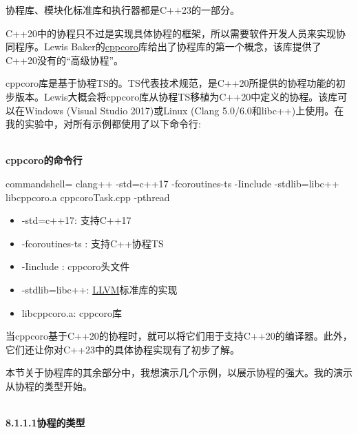协程库、模块化标准库和执行器都是C++23的一部分。



C++20中的协程只不过是实现具体协程的框架，所以需要软件开发人员来实现协同程序。Lewis Baker的\href{https://github.com/lewissbaker/cppcoro}{cppcoro}库给出了协程库的第一个概念，该库提供了C++20没有的“高级协程”。

\begin{tcolorbox}[breakable,enhanced jigsaw,colback=blue!5!white,colframe=blue!75!black,title={使用cppcoro}]
	
cppcoro库是基于协程TS的。TS代表技术规范，是C++20所提供的协程功能的初步版本。Lewis大概会将cppcoro库从协程TS移植为C++20中定义的协程。该库可以在Windows (Visual Studio 2017)或Linux (Clang 5.0/6.0和libc++)上使用。在我的实验中，对所有示例都使用了以下命令行:

\hspace*{\fill} \\ %
\noindent
\textbf{cppcoro的命令行}
{\footnotesize
\begin{tcblisting}{commandshell={}}
clang++ -std=c++17 -fcoroutines-ts -Iinclude -stdlib=libc++ libcppcoro.a
  cppcoroTask.cpp -pthread
\end{tcblisting}
}

\begin{itemize}
\item 
-std=c++17: 支持C++17

\item 
-fcoroutines-ts : 支持C++协程TS

\item 
-Iinclude : cppcoro头文件

\item 
-stdlib=libc++: \href{https://en.wikipedia.org/wiki/LLVM}{LLVM}标准库的实现

\item 
libcppcoro.a: cppcoro库
\end{itemize}

当cppcoro基于C++20的协程时，就可以将它们用于支持C++20的编译器。此外，它们还让你对C++23中的具体协程实现有了初步了解。

本节关于协程库的其余部分中，我想演示几个示例，以展示协程的强大。我的演示从协程的类型开始。

\end{tcolorbox}

\hspace*{\fill} \\ %
\noindent
\textbf{8.1.1.1\hspace{0.2cm}协程的类型}

